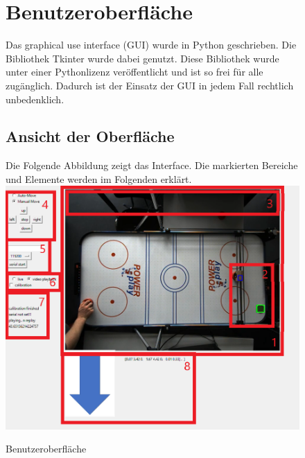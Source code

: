 \clearpage
\begin{figure}
\section{Benutzeroberfläche}
\label{sect:gui}
Das graphical use interface (GUI) wurde in Python geschrieben. Die Bibliothek Tkinter wurde dabei genutzt. Diese Bibliothek wurde unter einer Pythonlizenz veröffentlicht und ist so frei für alle zugänglich. Dadurch ist der Einsatz der GUI in jedem Fall rechtlich unbedenklich.\\

\subsection{Ansicht der Oberfläche}
\label{subsect:gui_pic}


Die Folgende Abbildung zeigt das Interface. Die markierten Bereiche und Elemente werden im Folgenden erklärt.\\
\includegraphics[width=\textwidth]{images/gui_pic_marked}
 \caption{Benutzeroberfläche}
 \label{gui_pic}

\end{figure}
